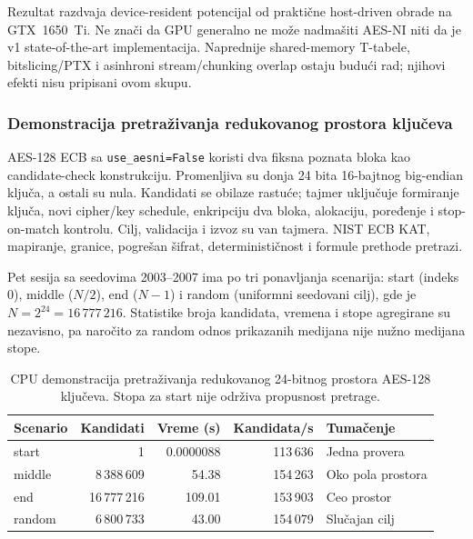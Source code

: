 Rezultat razdvaja device-resident potencijal od praktične host-driven
obrade na GTX~1650~Ti. Ne znači da GPU generalno ne može nadmašiti
AES-NI niti da je v1 state-of-the-art implementacija. Naprednije
shared-memory T-tabele, bitslicing/PTX i asinhroni stream/chunking
overlap ostaju budući rad; njihovi efekti nisu pripisani ovom skupu.

\subsubsection{Demonstracija pretraživanja redukovanog prostora ključeva}
AES-128 ECB sa \texttt{use\_aesni=False} koristi dva fiksna poznata
bloka kao candidate-check konstrukciju. Promenljiva su donja 24 bita
16-bajtnog big-endian ključa, a ostali su nula. Kandidati se obilaze
rastuće; tajmer uključuje formiranje ključa, novi cipher/key schedule,
enkripciju dva bloka, alokaciju, poređenje i stop-on-match kontrolu.
Cilj, validacija i izvoz su van tajmera. NIST ECB KAT, mapiranje,
granice, pogrešan šifrat, determinističnost i formule prethode pretrazi.

Pet sesija sa seedovima 2003--2007 ima po tri ponavljanja scenarija:
start (indeks 0), middle ($N/2$), end ($N-1$) i random (uniformni
seedovani cilj), gde je $N=2^{24}=16\,777\,216$. Statistike broja
kandidata, vremena i stope agregirane su nezavisno, pa naročito za
random odnos prikazanih medijana nije nužno medijana stope.

\begin{table}[htbp]
\centering
\small
\caption{CPU demonstracija pretraživanja redukovanog 24-bitnog prostora
AES-128 ključeva. Stopa za start nije održiva propusnost pretrage.}
\label{tab:brute-force-reduced-keyspace}
\begin{tabular}{lrrrl}
\toprule
Scenario & Kandidati & Vreme (s) & Kandidata/s & Tumačenje \\
\midrule
start  & 1              & 0.0000088 & 113\,636 & Jedna provera \\
middle & 8\,388\,609   & 54.38     & 154\,263 & Oko pola prostora \\
end    & 16\,777\,216  & 109.01    & 153\,903 & Ceo prostor \\
random & 6\,800\,733   & 43.00     & 154\,079 & Slučajan cilj \\
\bottomrule
\end{tabular}
\end{table}

